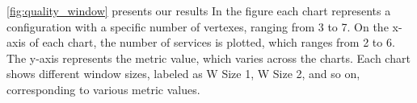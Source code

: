 





\cref{fig:quality_window} presents our results
In the figure each chart represents a configuration with a specific number of vertexes, ranging from 3 to 7.
On the x-axis of each chart, the number of services is plotted, which ranges from 2 to 6.
The y-axis represents the metric value, which varies across the charts.
Each chart shows different window sizes, labeled as W Size 1, W Size 2, and so on, corresponding to various metric values.

